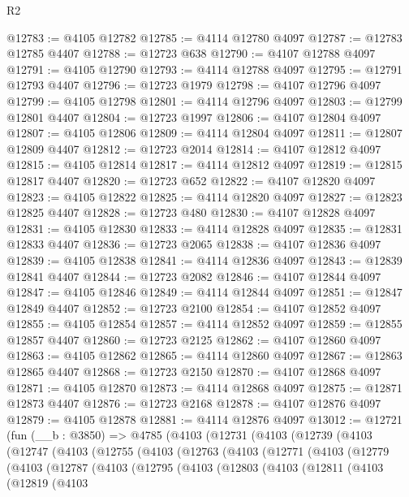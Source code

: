 \begin{lexlean}{R2}
\begin{coremodule}
@12783 := @4105 @12782
@12785 := @4114 @12780 @4097
@12787 := @12783 @12785 @4407
@12788 := @12723 @638
@12790 := @4107 @12788 @4097
@12791 := @4105 @12790
@12793 := @4114 @12788 @4097
@12795 := @12791 @12793 @4407
@12796 := @12723 @1979
@12798 := @4107 @12796 @4097
@12799 := @4105 @12798
@12801 := @4114 @12796 @4097
@12803 := @12799 @12801 @4407
@12804 := @12723 @1997
@12806 := @4107 @12804 @4097
@12807 := @4105 @12806
@12809 := @4114 @12804 @4097
@12811 := @12807 @12809 @4407
@12812 := @12723 @2014
@12814 := @4107 @12812 @4097
@12815 := @4105 @12814
@12817 := @4114 @12812 @4097
@12819 := @12815 @12817 @4407
@12820 := @12723 @652
@12822 := @4107 @12820 @4097
@12823 := @4105 @12822
@12825 := @4114 @12820 @4097
@12827 := @12823 @12825 @4407
@12828 := @12723 @480
@12830 := @4107 @12828 @4097
@12831 := @4105 @12830
@12833 := @4114 @12828 @4097
@12835 := @12831 @12833 @4407
@12836 := @12723 @2065
@12838 := @4107 @12836 @4097
@12839 := @4105 @12838
@12841 := @4114 @12836 @4097
@12843 := @12839 @12841 @4407
@12844 := @12723 @2082
@12846 := @4107 @12844 @4097
@12847 := @4105 @12846
@12849 := @4114 @12844 @4097
@12851 := @12847 @12849 @4407
@12852 := @12723 @2100
@12854 := @4107 @12852 @4097
@12855 := @4105 @12854
@12857 := @4114 @12852 @4097
@12859 := @12855 @12857 @4407
@12860 := @12723 @2125
@12862 := @4107 @12860 @4097
@12863 := @4105 @12862
@12865 := @4114 @12860 @4097
@12867 := @12863 @12865 @4407
@12868 := @12723 @2150
@12870 := @4107 @12868 @4097
@12871 := @4105 @12870
@12873 := @4114 @12868 @4097
@12875 := @12871 @12873 @4407
@12876 := @12723 @2168
@12878 := @4107 @12876 @4097
@12879 := @4105 @12878
@12881 := @4114 @12876 @4097
@13012 := @12721
    (fun (__b : @3850) =>
    @4785
      (@4103
        (@12731
          (@4103
            (@12739
              (@4103
                (@12747
                  (@4103
                    (@12755
                      (@4103
                        (@12763
                          (@4103
                            (@12771
                              (@4103
                                (@12779
                                  (@4103
                                    (@12787
                                      (@4103
                                        (@12795
                                          (@4103
                                            (@12803
                                              (@4103
                                                (@12811
                                                  (@4103
                                                    (@12819
                                                      (@4103

\end{coremodule}
\end{lexlean}
